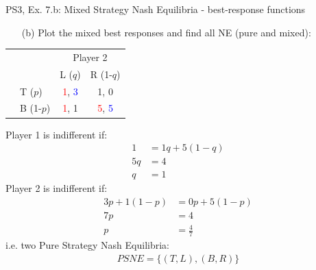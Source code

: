 \begin{frame}{PS3, Ex. 7.b: Mixed Strategy Nash Equilibria - best-response functions}
  \begin{multicols}{2}
    \begin{itemize}
      \item[(b)] Plot the mixed best responses and find all NE (pure and mixed):
    \end{itemize}
    \begin{table}
      \begin{tabular}{cl|c|c|}
        & \multicolumn{1}{c}{} & \multicolumn{2}{c}{\color{blue}Player 2}\\
        \parbox[t]{1mm}{}
        &  &  &  \\
        & T  ($p$)  & \textcolor{red}{1}, \textcolor{blue}{3} & 1, 0 \\
        & B  (1-$p$)& \textcolor{red}{1}, 1 & \textcolor{red}{5}, \textcolor{blue}{5} \\
      \end{tabular}
    \end{table}
    Player 1 is indifferent if:
    \begin{align*}
      1 &= 1q + 5(1-q) \\
      5q&= 4          \\
      q &= 1
    \end{align*}
    Player 2 is indifferent if:
    \begin{align*}
      3p + 1(1-p)&= 0p+5(1-p)\\
      7p         &= 4     \\
      p          &= \frac{4}{7}
    \end{align*}
    i.e. two Pure Strategy Nash Equilibria:
    \begin{align*}
      PSNE=\{(T,L),(B,R)\}
    \end{align*}
  \vfill\null \columnbreak
  \vfill\null
  \end{multicols}
\end{frame}
